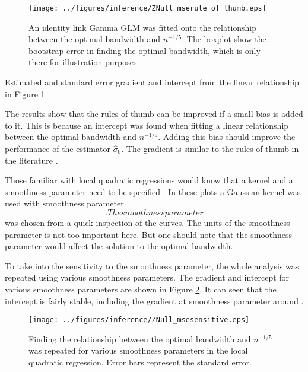 \begin{figure}
	\centering
	\texttt{[image: ../figures/inference/ZNull\_mserule\_of\_thumb.eps]}
	\caption{An identity link Gamma GLM was fitted onto the relationship between the optimal bandwidth and $n^{-1/5}$. The boxplot show the bootstrap error in finding the optimal bandwidth, which is only there for illustration purposes.}
	\label{fig:inference_ZNull_mserule_of_thumb}
\end{figure}

\begin{table}
	\centering
	
	\caption{Estimated and standard error gradient and intercept from the linear relationship in Figure \ref{fig:inference_ZNull_mserule_of_thumb}.}
	\label{table:inference_ZNull_mse_glm_estimate}
\end{table}

The results show that the rules of thumb can be improved if a small bias is added to it. This is because an intercept was found when fitting a linear relationship between the optimal bandwidth and $n^{-1/5}$. Adding this bias should improve the performance of the estimator $\widehat{\sigma}_0$. The gradient is similar to the rules of thumb in the literature \citep{sheather2004density}.

Those familiar with local quadratic regressions would know that a kernel and a smoothness parameter need to be specified \citep{friedman2001elements}. In these plots a Gaussian kernel was used with smoothness parameter $$. The smoothness parameter $$ was chosen from a quick inspection of the curves. The units of the smoothness parameter is not too important here. But one should note that the smoothness parameter would affect the solution to the optimal bandwidth.

To take into the sensitivity to the smoothness parameter, the whole analysis was repeated using various smoothness parameters. The gradient and intercept for various smoothness parameters are shown in Figure \ref{fig:inference_ZNull_msesensitive}. It can seen that the intercept is fairly stable, including the gradient at smoothness parameter around $$.

\begin{figure}
	\centering
	\texttt{[image: ../figures/inference/ZNull\_msesensitive.eps]}
	\caption{Finding the relationship between the optimal bandwidth and $n^{-1/5}$ was repeated for various smoothness parameters in the local quadratic regression. Error bars represent the standard error.} 
	\label{fig:inference_ZNull_msesensitive}
\end{figure}


